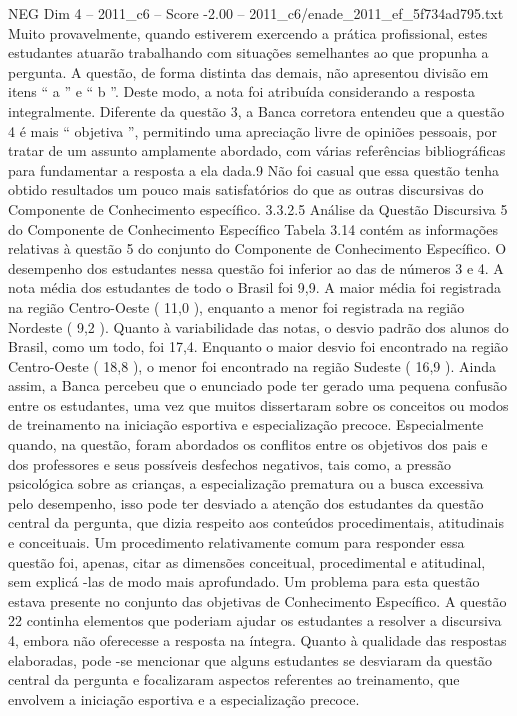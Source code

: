 \begin{textsample}{NEG Dim 4 – 2011\_c6 – Score -2.00 – 2011\_c6/enade\_2011\_ef\_5f734ad795.txt}
Muito provavelmente, quando estiverem exercendo a prática profissional, estes estudantes atuarão trabalhando com situações semelhantes ao que propunha a pergunta.
A questão, de forma distinta das demais, não apresentou divisão em itens “ a ” e “ b ”.
Deste modo, a nota foi atribuída considerando a resposta integralmente.
Diferente da questão 3, a Banca corretora entendeu que a questão 4 é mais “ objetiva ”, permitindo uma apreciação livre de opiniões pessoais, por tratar de um assunto amplamente abordado, com várias referências bibliográficas para fundamentar a resposta a ela dada.9 Não foi casual que essa questão tenha obtido resultados um pouco mais satisfatórios do que as outras discursivas do Componente de Conhecimento específico. 3.3.2.5 Análise da Questão Discursiva 5 do Componente de Conhecimento Específico Tabela 3.14 contém as informações relativas à questão 5 do conjunto do Componente de Conhecimento Específico.
O desempenho dos estudantes nessa questão foi inferior ao das de números 3 e 4.
A nota média dos estudantes de todo o Brasil foi 9,9.
A maior média foi registrada na região Centro-Oeste ( 11,0 ), enquanto a menor foi registrada na região Nordeste ( 9,2 ).
Quanto à variabilidade das notas, o desvio padrão dos alunos do Brasil, como um todo, foi 17,4.
Enquanto o maior desvio foi encontrado na região Centro-Oeste ( 18,8 ), o menor foi encontrado na região Sudeste ( 16,9 ).
Ainda assim, a Banca percebeu que o enunciado pode ter gerado uma pequena confusão entre os estudantes, uma vez que muitos dissertaram sobre os conceitos ou modos de treinamento na iniciação esportiva e especialização precoce.
Especialmente quando, na questão, foram abordados os conflitos entre os objetivos dos pais e dos professores e seus possíveis desfechos negativos, tais como, a pressão psicológica sobre as crianças, a especialização prematura ou a busca excessiva pelo desempenho, isso pode ter desviado a atenção dos estudantes da questão central da pergunta, que dizia respeito aos conteúdos procedimentais, atitudinais e conceituais.
Um procedimento relativamente comum para responder essa questão foi, apenas, citar as dimensões conceitual, procedimental e atitudinal, sem explicá -las de modo mais aprofundado.
Um problema para esta questão estava presente no conjunto das objetivas de Conhecimento Específico.
A questão 22 continha elementos que poderiam ajudar os estudantes a resolver a discursiva 4, embora não oferecesse a resposta na íntegra.
Quanto à qualidade das respostas elaboradas, pode -se mencionar que alguns estudantes se desviaram da questão central da pergunta e focalizaram aspectos referentes ao treinamento, que envolvem a iniciação esportiva e a especialização precoce.

\end{textsample}
